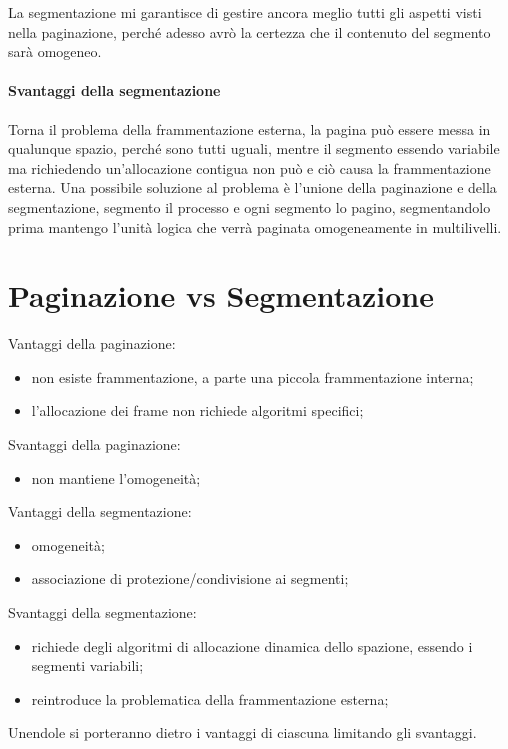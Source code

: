 \documentclass[a4paper, 12pt]{book}
\begin{document}
La segmentazione mi garantisce di gestire ancora meglio tutti gli aspetti visti nella paginazione, perché adesso avrò la certezza
che il contenuto del segmento sarà omogeneo.

\paragraph{Svantaggi della segmentazione}

Torna il problema della frammentazione esterna, la pagina può essere messa in qualunque spazio, perché sono tutti uguali, 
mentre il segmento essendo variabile ma richiedendo un'allocazione contigua non può e ciò causa la frammentazione esterna. 
Una possibile soluzione al problema è l'unione della paginazione e della segmentazione, segmento il processo e ogni segmento lo 
pagino, segmentandolo prima mantengo l'unità logica che verrà paginata omogeneamente in multilivelli.

\section{Paginazione vs Segmentazione}

Vantaggi della paginazione:
\begin{itemize}
    \item non esiste frammentazione, a parte una piccola frammentazione interna;
    \item l'allocazione dei frame non richiede algoritmi specifici;
\end{itemize} 
Svantaggi della paginazione:
\begin{itemize}
    \item non mantiene l'omogeneità;
\end{itemize}
Vantaggi della segmentazione:
\begin{itemize}
    \item omogeneità;
    \item associazione di protezione/condivisione ai segmenti;
\end{itemize} 
Svantaggi della segmentazione:
\begin{itemize}
    \item richiede degli algoritmi di allocazione dinamica dello spazione, essendo i segmenti variabili;
    \item reintroduce la problematica della frammentazione esterna;
\end{itemize}

Unendole si porteranno dietro i vantaggi di ciascuna limitando gli svantaggi.
\end{document}
